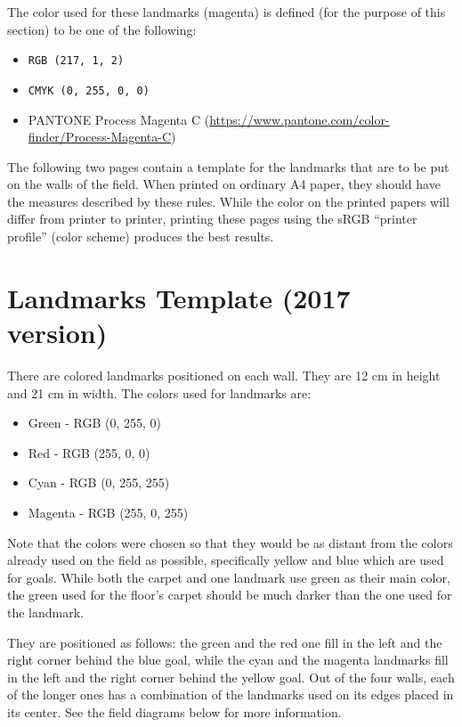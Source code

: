 \documentclass{article}
\begin{document}
The color used for these landmarks (magenta) is defined (for the purpose of
this section) to be one of the following:

\begin{itemize}
    \item \texttt{RGB (217, 1, 2)}
    \item \texttt{CMYK (0, 255, 0, 0)}
    \item PANTONE Process Magenta C (\url{https://www.pantone.com/color-finder/Process-Magenta-C})
\end{itemize}


The following two pages contain a template for the landmarks that are to be
put on the walls of the field. When printed on ordinary A4 paper, they should
have the measures described by these rules. While the color on the printed
papers will differ from printer to printer, printing these pages using the sRGB
``printer profile'' (color scheme) produces the best results.




\section{Landmarks Template (2017 version)\label{ref-066}}

There are colored landmarks positioned on each wall. They are 12 cm in height
and 21 cm in width. The colors used for landmarks are:

\begin{itemize}
\item Green - RGB (0, 255, 0)

\item Red - RGB (255, 0, 0)

\item Cyan - RGB (0, 255, 255)

\item Magenta - RGB (255, 0, 255)

\end{itemize}

Note that the colors were chosen so that they would be as distant from the
colors already used on the field as possible, specifically yellow and blue
which are used for goals. While both the carpet and one landmark use green as
their main color, the green used for the floor's carpet should be much darker
than the one used for the landmark.

They are positioned as follows: the green and the red one fill in the left and
the right corner behind the blue goal, while the cyan and the magenta landmarks
fill in the left and the right corner behind the yellow goal. Out of the four
walls, each of the longer ones has a combination of the landmarks used on its
edges placed in its center. See the field diagrams below for more
information.
\end{document}

